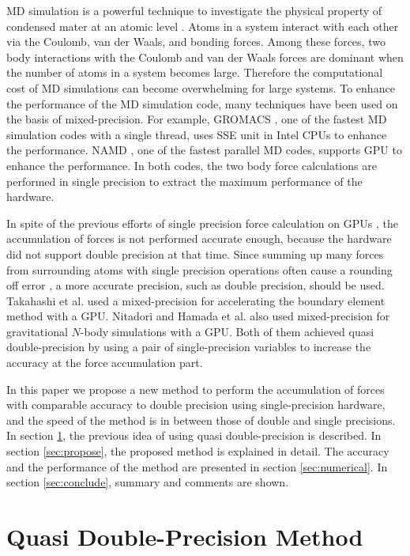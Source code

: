 MD simulation is a powerful technique to investigate the physical
property of condensed mater at an atomic level \cite{Karplus}. Atoms
in a system interact with each other via the Coulomb, van der Waals,
and bonding forces. Among these forces, two body interactions with the
Coulomb and van der Waals forces are dominant when the number of atoms
in a system becomes large. Therefore the computational cost of MD
simulations can become overwhelming for large systems.  To enhance the
performance of the MD simulation code, many techniques have been used
on the basis of mixed-precision. For example, GROMACS \cite{GROMACS},
one of the fastest MD simulation codes with a single thread, uses SSE
unit in Intel CPUs to enhance the performance. NAMD \cite{NAMD1,
NAMD2}, one of the fastest parallel MD codes, supports GPU to enhance
the performance. In both codes, the two body force calculations are
performed in single precision to extract the maximum performance of
the hardware.

In spite of the previous efforts of single precision force calculation
on GPUs \cite{NAMD1, NAMD2, GPUneighbor}, the accumulation of forces
is not performed accurate enough, because the hardware did not support
double precision at that time.  Since summing up many forces from
surrounding atoms with single precision operations often cause a
rounding off error \cite{Hamada2}, a more accurate precision, such as
double precision, should be used.  Takahashi et al. \cite{Takahashi1,
Takahashi2} used a mixed-precision for accelerating the boundary
element method with a GPU. Nitadori \cite{Nitadori} and Hamada et
al. \cite{Hamada1} also used mixed-precision for gravitational
$N$-body simulations with a GPU. Both of them achieved quasi
double-precision by using a pair of single-precision variables to
increase the accuracy at the force accumulation part.

In this paper we propose a new method to perform the accumulation of
forces with comparable accuracy to double precision using
single-precision hardware, and the speed of the method is in between
those of double and single precisions.
In section \ref{sec:quasidouble}, the previous idea of using quasi
double-precision is described. In section \ref{sec:propose}, the
proposed method is explained in detail. The accuracy and the
performance of the method are presented in section
\ref{sec:numerical}. In section \ref{sec:conclude}, summary and
comments are shown.

\section{Quasi Double-Precision Method}\label{sec:quasidouble}

